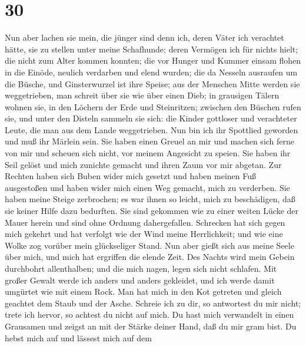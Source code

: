\hypertarget{section-29}{%
\section{30}\label{section-29}}

 Nun aber lachen sie mein, die jünger sind denn ich, deren
Väter ich verachtet hätte, sie zu stellen unter meine Schafhunde;
 deren Vermögen ich für nichts hielt; die nicht zum Alter
kommen konnten;  die vor Hunger und Kummer einsam flohen in
die Einöde, neulich verdarben und elend wurden;  die da
Nesseln ausraufen um die Büsche, und Ginsterwurzel ist ihre Speise;
 aus der Menschen Mitte werden sie weggetrieben, man schreit
über sie wie über einen Dieb;  in grausigen Tälern wohnen
sie, in den Löchern der Erde und Steinritzen;  zwischen den
Büschen rufen sie, und unter den Disteln sammeln sie sich: 
die Kinder gottloser und verachteter Leute, die man aus dem Lande
weggetrieben.  Nun bin ich ihr Spottlied geworden und muß
ihr Märlein sein.  Sie haben einen Greuel an mir und machen
sich ferne von mir und scheuen sich nicht, vor meinem Angesicht zu
speien.  Sie haben ihr Seil gelöst und mich zunichte
gemacht und ihren Zaum vor mir abgetan.  Zur Rechten haben
sich Buben wider mich gesetzt und haben meinen Fuß ausgestoßen und haben
wider mich einen Weg gemacht, mich zu verderben.  Sie haben
meine Steige zerbrochen; es war ihnen so leicht, mich zu beschädigen,
daß sie keiner Hilfe dazu bedurften.  Sie sind gekommen wie
zu einer weiten Lücke der Mauer herein und sind ohne Ordnung
dahergefallen.  Schrecken hat sich gegen mich gekehrt und
hat verfolgt wie der Wind meine Herrlichkeit; und wie eine Wolke zog
vorüber mein glückseliger Stand.  Nun aber gießt sich aus
meine Seele über mich, und mich hat ergriffen die elende Zeit.
 Des Nachts wird mein Gebein durchbohrt allenthalben; und
die mich nagen, legen sich nicht schlafen.  Mit großer
Gewalt werde ich anders und anders gekleidet, und ich werde damit
umgürtet wie mit einem Rock.  Man hat mich in den Kot
getreten und gleich geachtet dem Staub und der Asche. 
Schreie ich zu dir, so antwortest du mir nicht; trete ich hervor, so
achtest du nicht auf mich.  Du hast mich verwandelt in
einen Grausamen und zeigst an mit der Stärke deiner Hand, daß du mir
gram bist.  Du hebst mich auf und lässest mich auf dem
